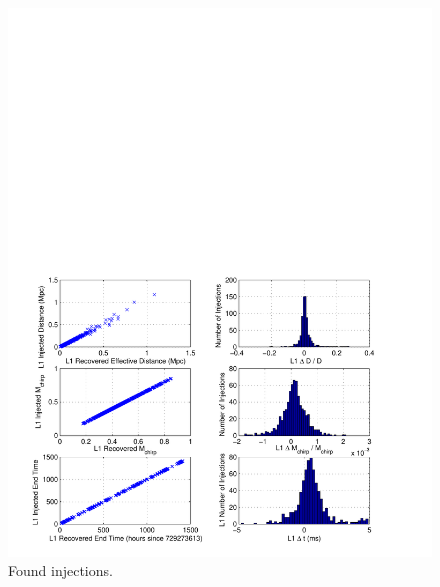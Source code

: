 \begin{figure}[p]
\begin{center}
\includegraphics[width=\textwidth]{figures/result/l1_param_error}
\end{center}
\caption{\label{f:l1_param_error}%
Found injections.
}
\end{figure}

